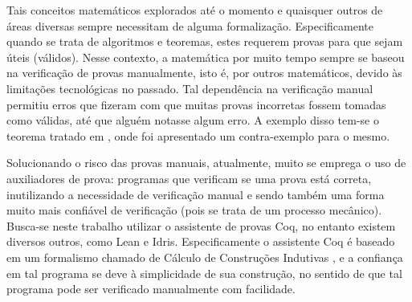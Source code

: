 

Tais conceitos matemáticos explorados até o momento e quaisquer outros de áreas diversas sempre necessitam de alguma formalização. Especificamente quando se trata de algoritmos e teoremas, estes requerem provas para que sejam úteis (válidos). Nesse contexto, a matemática por muito tempo sempre se baseou na verificação de provas manualmente, isto é, por outros matemáticos, devido às limitações tecnológicas no passado. Tal dependência na verificação manual permitiu erros que fizeram com que muitas provas incorretas fossem tomadas como válidas, até que alguém notasse algum erro.  A exemplo disso tem-se o teorema tratado em \cite{Neeman2002}, onde foi apresentado um contra-exemplo para o mesmo.

Solucionando o risco das provas manuais, atualmente, muito se emprega o uso de auxiliadores de prova: programas que verificam se uma prova está correta, inutilizando a necessidade de verificação manual e sendo também uma forma muito mais confiável de verificação (pois se trata de um processo mecânico). Busca-se neste trabalho utilizar o assistente de provas Coq, no entanto existem diversos outros, como Lean e Idris. Especificamente o assistente Coq é baseado em um formalismo chamado de Cálculo de Construções Indutivas \cite{paulinmohring:hal-01094195}, e a confiança em tal programa se deve à simplicidade de sua construção, no sentido de que tal programa pode ser verificado manualmente com facilidade.

